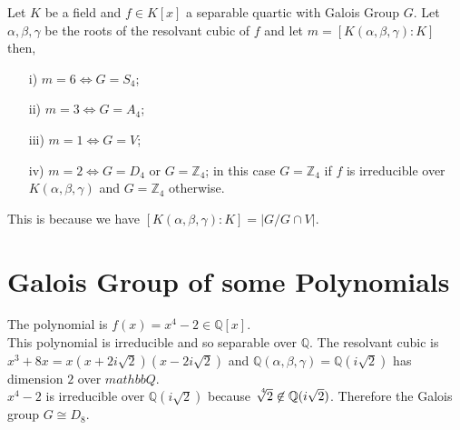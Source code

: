\begin{theorem}
  Let \(K\) be a field and \(f \in K[x]\) a separable quartic with Galois Group \(G\). Let \(\alpha, \beta, \gamma\) be the roots of the resolvant cubic of \(f\) and let \(m= [K(\alpha, \beta, \gamma) : K]\) then,
\begin{enumerate}
\item[i)] \(m=6 \Longleftrightarrow G=S_4\);
\item[ii)] \(m=3 \Longleftrightarrow G=A_4\);
\item[iii)] \(m=1 \Longleftrightarrow G=V\);
\item[iv)] \(m=2 \Longleftrightarrow G=D_4\) or \(G={\mathbb{Z}}_4\); in this case \(G={\mathbb{Z}}_4\) if \(f\) is irreducible over \(K(\alpha, \beta, \gamma)\) and \(G={\mathbb{Z}}_4\) otherwise.
  \end{enumerate}
\end{theorem}
This is because we have \([K(\alpha,\beta,\gamma):K] = |G/G \cap V|\).

\section{Galois Group of some Polynomials}

\begin{example}
The polynomial is \(f(x)=x^4-2 \in \mathbb{Q}[x]\).\\
This polynomial is irreducible and so separable over \(\mathbb{Q}\). The resolvant cubic is \(x^3+8x = x(x+2i\sqrt{2})(x-2i\sqrt{2})\) and 
\(\mathbb{Q}(\alpha,\beta, \gamma)=\mathbb{Q}(i\sqrt{2})\) has dimension \(2\) over \(mathbb{Q}\).\\
\(x^4-2\) is irreducible over \(\mathbb{Q}(i\sqrt{2})\) because \(\sqrt[\leftroot{-3}\uproot{3}4]{2} \not\in \mathbb{Q}(i\sqrt{2})\).
Therefore the Galois group \(G \cong D_8\).
\end{example}









